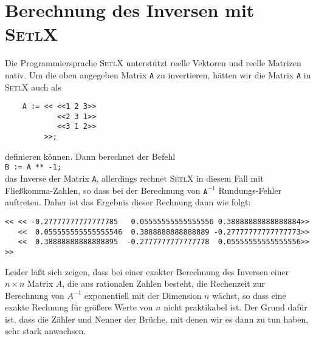 \section{Berechnung des Inversen mit \textsc{SetlX}}
Die Programmiersprache \textsc{SetlX} unterst\"utzt reelle Vektoren und reelle Matrizen nativ.  Um die oben
angegeben Matrix \texttt{A} zu invertieren, h\"atten wir die Matrix \texttt{A} in \textsc{SetlX} auch als
\begin{verbatim}
    A := << <<1 2 3>>
            <<2 3 1>>
            <<3 1 2>>
         >>;
\end{verbatim}
definieren k\"onnen.  Dann berechnet der Befehl
\\[0.2cm]
\hspace*{1.3cm}
\texttt{B := A ** -1;}
\\[0.2cm]
das Inverse der Matrix \texttt{A}, allerdings rechnet \textsc{SetlX} in diesem Fall mit
Flie{\ss}komma-Zahlen, so dass bei der Berechnung von $\mathtt{A}^{-1}$ Rundungs-Fehler auftreten.
Daher ist das Ergebnis dieser Rechnung dann wie folgt:
\begin{verbatim}
<< << -0.27777777777777785   0.05555555555555556 0.38888888888888884>>
   <<  0.055555555555555546  0.3888888888888889 -0.27777777777777773>>
   <<  0.38888888888888895  -0.2777777777777778  0.05555555555555556>>
>>
\end{verbatim}
Leider l\"a{\ss}t sich zeigen, dass bei einer exakter Berechnung des Inversen einer $n \times n$ Matrix
$A$, die aus rationalen Zahlen besteht, die Rechenzeit zur Berechnung von $A^{-1}$ exponentiell mit
der Dimension $n$ w\"achst, so dass eine exakte Rechnung f\"ur gr\"o{\ss}ere Werte von $n$ nicht
praktikabel ist.  Der Grund daf\"ur ist, dass die Z\"ahler und Nenner der Br\"uche, mit denen wir es
dann zu tun haben, sehr stark anwachsen.

